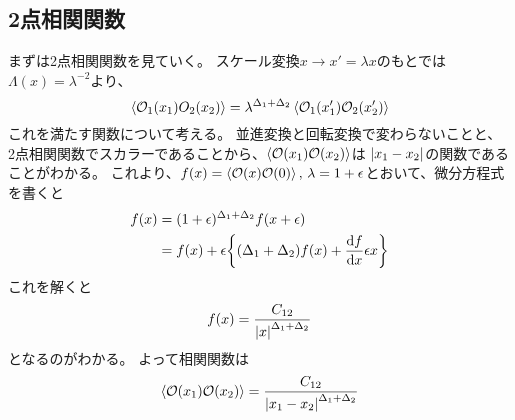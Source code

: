 \documentclass[../../master.tex]{subfiles}
\begin{document}
\subsection*{2点相関関数}
まずは2点相関関数を見ていく。
スケール変換\(x\rightarrow x'=\lambda x\)のもとでは\(\Lambda(x) =\lambda^{-2}\)より、
\begin{equation}
    \ev{\mathcal{O}_1(x_1){O}_2(x_2)}
    = \lambda^{\Delta_1 + \Delta_2}\ev{\mathcal{O}_1(x'_1)\mathcal{O}_2(x'_2)}
\end{equation}
これを満たす関数について考える。
並進変換と回転変換で変わらないことと、
2点相関関数でスカラーであることから、\(\ev{\mathcal{O}(x_1)\mathcal{O}(x_2)}\)は
\(\abs{x_1-x_2}\)の関数であることがわかる。
これより、\(f(x) = \ev{\mathcal{O}(x)\mathcal{O}(0)},\,\lambda=1+\epsilon\)とおいて、微分方程式を書くと
\begin{align*}
    f(x)
    &= (1+\epsilon)^{\Delta_1 + \Delta_2} f(x + \epsilon)\\
    &= f(x) + \epsilon\qty{(\Delta_1 + \Delta_2)f(x) + \dv{f}{x}\epsilon x}
\end{align*}
これを解くと
\begin{equation*}
    f(x) = \frac{C_{12}}{\abs{x}^{\Delta_1 + \Delta_2}}
\end{equation*}
となるのがわかる。
よって相関関数は
\begin{equation}
    \ev{\mathcal{O}(x_1)\mathcal{O}(x_2)}= \frac{C_{12}}{\abs{x_1-x_2}^{\Delta_1 + \Delta_2}}
\end{equation}
\end{document}
